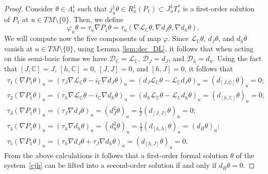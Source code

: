 \begin{proof}
Consider $\theta\in \Lambda^1_v$ such that $j^1_u\theta\in
R^1_u(P_1)\subset J_u^1T^*_v$ is a f\/irst-order solution of $P_1$
at $u\in TM\setminus\{0\}$. Then, we def\/ine
\[
 \varphi_u\theta=\tau_u\nabla P_1\theta=\tau_u(\nabla \mathcal{L}_{\mathbb{C}}\theta,
\nabla d_J\theta, \nabla d_h\theta).
\] We will compute now the
f\/ive components of map $\varphi$. Since
$\mathcal{L}_{\mathbb{C}}\theta$, $d_J\theta$, and $d_h\theta$
vanish at $u\in TM\setminus\{0\}$, using Lemma \ref{lem:dec_DL},
it follows that when acting on this semi-basic forms we have
$\mathcal{D}_{\mathbb{C}}=\mathcal{L}_{\mathbb{C}}$,
$\mathcal{D}_{J}=d_J$, and $\mathcal{D}_{h}=d_h$. Using the fact that
$[J, \mathbb{C}]=J$, $[h, \mathbb{C}]=0$,  $[J, J]=0$, and $[h,J]=0$,
it follows that
\begin{gather*}
\tau_{1}\left(\nabla P_1\theta\right)_u  =  \left(\tau_J\nabla
\mathcal{L}_{\mathbb{C}} \theta - i_{\mathbb{C}}\nabla
d_J\theta\right)_u= \left(d_J\mathcal{L}_{\mathbb{C}} \theta -
\mathcal{L}_{\mathbb{C}} d_J\theta\right)_u =
(d_{[J,\mathbb{C}]}\theta)_u=0; \\
\tau_{2}\left(\nabla P_1\theta\right)_u  =  \left(\tau_h\nabla
\mathcal{L}_{\mathbb{C}} \theta - i_{\mathbb{C}}\nabla
d_h\theta\right)_u= \left(d_h\mathcal{L}_{\mathbb{C}} \theta -
\mathcal{L}_{\mathbb{C}} d_h\theta\right)_u =
(d_{[h,\mathbb{C}]}\theta)_u=0; \\
\tau_{3}\left(\nabla P_1\theta\right)_u  =  \left(\tau_J\nabla
d_J\theta\right)_u= \left(d^2_J\theta\right)_u
=\frac{1}{2}(d_{[J,J]}\theta)_u=0; \\
\tau_{4}\left(\nabla P_1\theta\right)_u  =  \left(\tau_h\nabla
d_h\theta\right)_u= \left(d^2_h\theta\right)_u
=\frac{1}{2}(d_{[h,h]}\theta)_u=(d_{R}\theta)_u; \\
\tau_{5}\left(\nabla P_1\theta\right)_u  =  \left(\tau_h\nabla
d_J\theta + \tau_J\nabla d_h\theta\right)_u=
(d_{[h,J]}\theta)_u=0.
\end{gather*}
From the above calculations it follows that a f\/irst-order formal
solution $\theta$ of the system~\eqref{cjh} can be lifted into a
second-order solution if and only if $d_R\theta=0$.
\end{proof}
